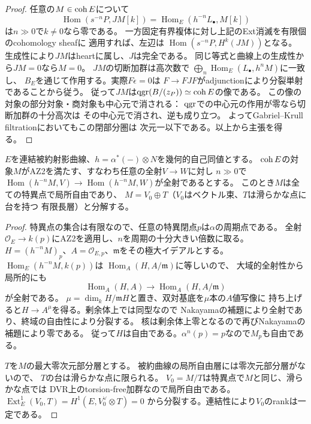 \begin{proof}
任意の$M\in\operatorname{coh} E$について
\[
 \operatorname{Hom}(s^{-n}P,JM[k])
 =\operatorname{Hom}_E(h^{-n}L_\bullet,M[k])
\]
は$n\gg0$で$k\ne0$なら零である。
一方固定有界複体に対し上記のExt消滅を有限個のcohomology sheafに
適用すれば、左辺は
$\operatorname{Hom}(s^{-n}P,H^k(JM))$となる。
生成性により$JM$はheartに属し、$J$は完全である。
同じ等式と曲線上の生成性から$JM=0$なら$M=0$。
$JM$の切断加群は高次数で
$\bigoplus_n\operatorname{Hom}_E(L_\bullet,h^nM)$に一致し、
$B_E$を通じて作用する。実際$F\epsilon=0$は
$F\to FJF$がadjunctionにより分裂単射であることから従う。
従って$JM$は$\operatorname{qgr}(B/(z_P))\simeq\operatorname{coh} E$の像である。
この像の対象の部分対象・商対象も中心元で消される：
$\operatorname{qgr}$での中心元の作用が零なら切断加群の十分高次は
その中心元で消され、逆も成り立つ。
よってGabriel--Krull filtrationにおいてもこの閉部分圏は
次元一以下である。以上から主張を得る。
\end{proof}

\begin{lemma}[AZ2による特異点での局所自由性]
\label{lem:ou-az2-singular-free}
$E$を連結被約射影曲線、$h=\alpha^*(-)\otimes N$を幾何的自己同値とする。
$\operatorname{coh} E$の対象$M$がAZ2を満たす、すなわち任意の全射$V\to W$に対し
$n\gg0$で$\operatorname{Hom}(h^{-n}M,V)\to
\operatorname{Hom}(h^{-n}M,W)$が全射であるとする。
このとき$M$は全ての特異点で局所自由であり、
$M=V_0\oplus T$（$V_0$はベクトル束、$T$は滑らかな点に台を持つ
有限長層）と分解する。
\end{lemma}
\begin{proof}
特異点の集合は有限なので、任意の特異閉点$p$は$\alpha$の周期点である。
全射$\mathcal O_E\to k(p)$にAZ2を適用し、$n$を周期の十分大きい倍数に取る。
$H=(h^{-n}M)_p$、$A=\mathcal O_{E,p}$、$\mathfrak m$をその極大イデアルとする。
$\operatorname{Hom}_E(h^{-n}M,k(p))$は
$\operatorname{Hom}_A(H,A/\mathfrak m)$に等しいので、
大域的全射性から局所的にも
\[
 \operatorname{Hom}_A(H,A)\longrightarrow
 \operatorname{Hom}_A(H,A/\mathfrak m)
\]
が全射である。
$\mu=\dim_k H/\mathfrak m H$と置き、双対基底を$\mu$本の$A$値写像に
持ち上げると$H\to A^\mu$を得る。剰余体上では同型なので
Nakayamaの補題により全射であり、終域の自由性により分裂する。
核は剰余体上零となるので再びNakayamaの補題により零である。
従って$H$は自由である。$\alpha^n(p)=p$なので$M_p$も自由である。

$T$を$M$の最大零次元部分層とする。
被約曲線の局所自由層には零次元部分層がないので、
$T$の台は滑らかな点に限られる。
$V_0=M/T$は特異点で$M$と同じ、滑らかな点では
DVR上のtorsion-free加群なので局所自由である。
$\operatorname{Ext}^1_E(V_0,T)=H^1(E,V_0^\vee\otimes T)=0$
から分裂する。連結性により$V_0$のrankは一定である。
\end{proof}

